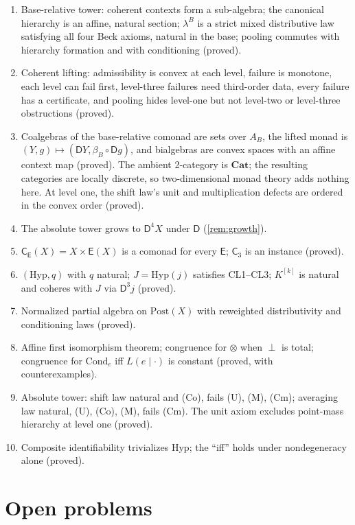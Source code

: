 \documentclass[11pt]{article}
\theoremstyle{definition}
\theoremstyle{remark}
\newcommand{\D}{\mathsf{D}}
\newcommand{\Hyp}{\mathrm{Hyp}}
\newcommand{\Post}{\mathrm{Post}}
\newcommand{\Cond}{\mathrm{Cond}}
\newcommand{\C}{\mathsf{C}}
\newcommand{\E}{\mathsf{E}}
\begin{document}
\begin{enumerate}[leftmargin=*]
\item Base-relative tower: coherent contexts form a sub-algebra; the canonical hierarchy is an
  affine, natural section; $\lambda^B$ is a strict mixed distributive law satisfying all four Beck
  axioms, natural in the base; pooling commutes with hierarchy formation and with conditioning
  (proved).
\item Coherent lifting: admissibility is convex at each level, failure is monotone, each level can
  fail first, level-three failures need third-order data, every failure has a certificate, and pooling
  hides level-one but not level-two or level-three obstructions (proved).
\item Coalgebras of the base-relative comonad are sets over $A_B$, the lifted monad is
  $(Y,g)\mapsto(\D Y,\beta_B\circ\D g)$, and bialgebras are convex spaces with an affine context map
  (proved). The ambient 2-category is $\mathbf{Cat}$; the resulting categories are locally discrete,
  so two-dimensional monad theory adds nothing here. At level one, the shift law's unit and
  multiplication defects are ordered in the convex order (proved).
\item The absolute tower grows to $\D^4X$ under $\D$ (\cref{rem:growth}).
\item $\C_\E(X)=X\times\E(X)$ is a comonad for every $\E$; $\C_3$ is an instance (proved).
\item $(\Hyp,q)$ with $q$ natural; $J=\Hyp(j)$ satisfies CL1--CL3; $K^{[k]}$ is natural and coheres
  with $J$ via $\D^3j$ (proved).
\item Normalized partial algebra on $\Post(X)$ with reweighted distributivity and conditioning laws
  (proved).
\item Affine first isomorphism theorem; congruence for $\otimes$ when $\perp$ is total; congruence for
  $\Cond_e$ iff $L(e\mid\cdot)$ is constant (proved, with counterexamples).
\item Absolute tower: shift law natural and (Co), fails (U), (M), (Cm); averaging law natural,
  (U), (Co), (M), fails (Cm). The unit axiom excludes point-mass hierarchy at level one (proved).
\item Composite identifiability trivializes $\Hyp$; the ``iff'' holds under nondegeneracy alone (proved).
\end{enumerate}

\section{Open problems}
\end{document}
